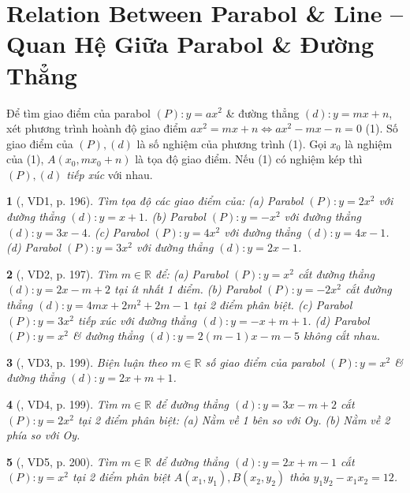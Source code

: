 \documentclass{article}
\newtheorem{baitoan}{}
\begin{document}

\section{Relation Between Parabol \& Line -- Quan Hệ Giữa Parabol \& Đường Thẳng}
 Để tìm giao điểm của parabol $(P):y = ax^2$ \& đường thẳng $(d):y = mx + n$, xét phương trình hoành độ giao điểm $ax^2 = mx + n\Leftrightarrow ax^2 - mx - n = 0$ (1). Số giao điểm của $(P),(d)$ là số nghiệm của phương trình (1). Gọi $x_0$ là nghiệm của (1), $A(x_0,mx_0 + n)$ là tọa độ giao điểm. Nếu (1) có nghiệm kép thì $(P),(d)$ \textit{tiếp xúc} với nhau.

\begin{baitoan}[\cite{Thu_Viet_Minh_ptb2}, VD1, p. 196]
	Tìm tọa độ các giao điểm của: (a) Parabol $(P):y = 2x^2$ với đường thẳng $(d):y = x + 1$. (b) Parabol $(P):y = -x^2$ với đường thẳng $(d):y = 3x - 4$. (c) Parabol $(P):y = 4x^2$ với đường thẳng $(d):y = 4x - 1$. (d) Parabol $(P):y = 3x^2$ với đường thẳng $(d):y = 2x - 1$.
\end{baitoan}

\begin{baitoan}[\cite{Thu_Viet_Minh_ptb2}, VD2, p. 197]
	Tìm $m\in\mathbb{R}$ để: (a) Parabol $(P):y = x^2$ cắt đường thẳng $(d):y = 2x - m + 2$ tại ít nhất 1 điểm. (b) Parabol $(P):y = -2x^2$ cắt đường thẳng $(d):y = 4mx + 2m^2 + 2m - 1$ tại 2 điểm phân biệt. (c) Parabol $(P):y = 3x^2$ tiếp xúc với đường thẳng $(d):y = -x + m + 1$. (d) Parabol $(P):y = x^2$ \& đường thẳng $(d):y = 2(m - 1)x - m - 5$ không cắt nhau.
\end{baitoan}

\begin{baitoan}[\cite{Thu_Viet_Minh_ptb2}, VD3, p. 199]
	Biện luận theo $m\in\mathbb{R}$ số giao điểm của parabol $(P):y = x^2$ \& đường thẳng $(d):y = 2x + m + 1$.
\end{baitoan}

\begin{baitoan}[\cite{Thu_Viet_Minh_ptb2}, VD4, p. 199]
	Tìm $m\in\mathbb{R}$ để đường thẳng $(d):y = 3x - m + 2$ cắt $(P):y = 2x^2$ tại 2 điểm phân biệt: (a) Nằm về 1 bên so với  Oy. (b) Nằm về 2 phía so với Oy.
\end{baitoan}

\begin{baitoan}[\cite{Thu_Viet_Minh_ptb2}, VD5, p. 200]
	Tìm $m\in\mathbb{R}$ để đường thẳng $(d):y = 2x + m - 1$ cắt $(P):y = x^2$ tại 2 điểm phân biệt $A(x_1,y_1),B(x_2,y_2)$ thỏa $y_1y_2 - x_1x_2 = 12$.
\end{baitoan}
\end{document}

